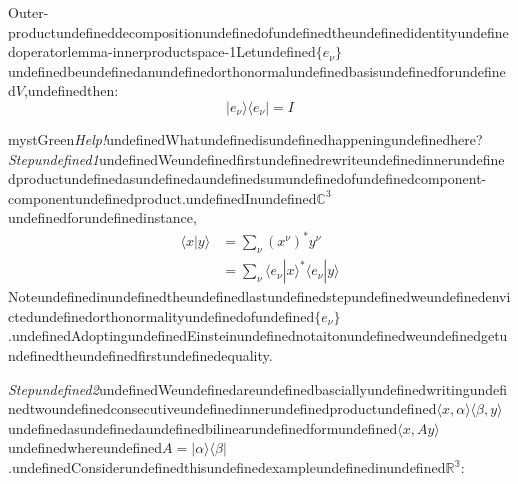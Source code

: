 \begin{mystthmlemma}{Outer-productundefineddecompositionundefinedofundefinedtheundefinedidentityundefinedoperator}{lemma-innerproductspace-1}Letundefined$\{e_{\nu}\}$undefinedbeundefinedanundefinedorthonormalundefinedbasisundefinedforundefined$V$,undefinedthen:
\begin{equation}
|e_{\nu} \rangle \langle e_{\nu}|=I
\end{equation}

\end{mystthmlemma}
\begin{mystadmonition}{mystGreen}{\emph{Help!}undefinedWhatundefinedisundefinedhappeningundefinedhere?}\textit{Stepundefined1}undefinedWeundefinedfirstundefinedrewriteundefinedinnerundefinedproductundefinedasundefinedaundefinedsumundefinedofundefinedcomponent-componentundefinedproduct.undefinedInundefined$\mathbb{C}^3$undefinedforundefinedinstance,
\begin{equation}
\begin{aligned}
\langle x | y\rangle &= \sum_{\nu} (x^{\nu})^* y^{\nu} \\
&= \sum_{\nu} \langle e_{\nu} | x \rangle^*  \langle e_{\nu} | y \rangle
\end{aligned}
\end{equation}
Noteundefinedinundefinedtheundefinedlastundefinedstepundefinedweundefinedenvictedundefinedorthonormalityundefinedofundefined$\{e_\nu\}$.undefinedAdoptingundefinedEinsteinundefinednotaitonundefinedweundefinedgetundefinedtheundefinedfirstundefinedequality.

\textit{Stepundefined2}undefinedWeundefinedareundefinedbasciallyundefinedwritingundefinedtwoundefinedconsecutiveundefinedinnerundefinedproductundefined$\langle x, \alpha \rangle \langle \beta, y \rangle$undefinedasundefinedaundefinedbilinearundefinedformundefined$\langle x, A y\rangle$undefinedwhereundefined$A=| \alpha \rangle \langle \beta |$.undefinedConsiderundefinedthisundefinedexampleundefinedinundefined$\mathbb{R^3}$:


\end{mystadmonition}
